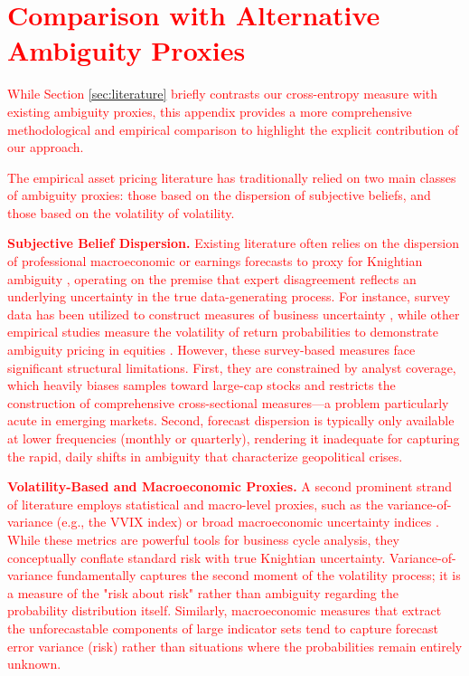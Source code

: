\documentclass[preprint,12pt,authoryear]{elsarticle}
\begin{document}
\section{\textcolor{red}{Comparison with Alternative Ambiguity Proxies}}
\label{app:alternative_proxies}
\renewcommand{\theequation}{B.\arabic{equation}}
\setcounter{equation}{0}

\textcolor{red}{While Section \ref{sec:literature} briefly contrasts our cross-entropy measure with existing ambiguity proxies, this appendix provides a more comprehensive methodological and empirical comparison to highlight the explicit contribution of our approach.}

\textcolor{red}{The empirical asset pricing literature has traditionally relied on two main classes of ambiguity proxies: those based on the dispersion of subjective beliefs, and those based on the volatility of volatility.}

\textcolor{red}{\textbf{Subjective Belief Dispersion.} Existing literature often relies on the dispersion of professional macroeconomic or earnings forecasts to proxy for Knightian ambiguity \citep{Ulrich2013}, operating on the premise that expert disagreement reflects an underlying uncertainty in the true data-generating process. For instance, survey data has been utilized to construct measures of business uncertainty \citep{Bachmann2013}, while other empirical studies measure the volatility of return probabilities to demonstrate ambiguity pricing in equities \citep{Brenner2018}. However, these survey-based measures face significant structural limitations. First, they are constrained by analyst coverage, which heavily biases samples toward large-cap stocks and restricts the construction of comprehensive cross-sectional measures—a problem particularly acute in emerging markets. Second, forecast dispersion is typically only available at lower frequencies (monthly or quarterly), rendering it inadequate for capturing the rapid, daily shifts in ambiguity that characterize geopolitical crises.}

\textcolor{red}{\textbf{Volatility-Based and Macroeconomic Proxies.} A second prominent strand of literature employs statistical and macro-level proxies, such as the variance-of-variance (e.g., the VVIX index) or broad macroeconomic uncertainty indices \citep{Jurado2015}. While these metrics are powerful tools for business cycle analysis, they conceptually conflate standard risk with true Knightian uncertainty. Variance-of-variance fundamentally captures the second moment of the volatility process; it is a measure of the "risk about risk" rather than ambiguity regarding the probability distribution itself. Similarly, macroeconomic measures that extract the unforecastable components of large indicator sets tend to capture forecast error variance (risk) rather than situations where the probabilities remain entirely unknown.}
\end{document}
